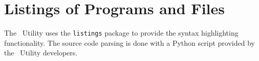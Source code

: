 
\section{Listings of Programs and Files}
	The \productName~Utility uses the \lstinline$listings$ package to provide the syntax highlighting functionality. 
	The source code parsing is done with a Python script provided by the \productName~Utility developers.\\[-1cm]
	
